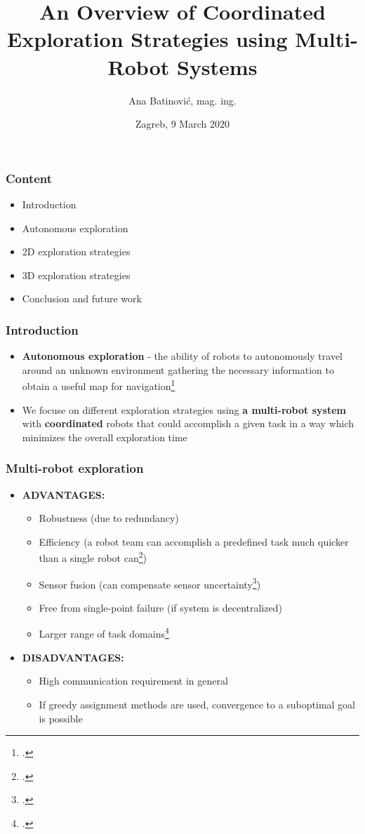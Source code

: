 \documentclass[aspectratio=43,mathserif]{beamer}
\author{Ana Batinović, mag. ing.}
\title[PhD Qualifying Exam]{An Overview of Coordinated Exploration Strategies using Multi-Robot Systems}
\date{Zagreb, 9 March 2020}
\begin{document}
\begin{frame}
\titlepage
\end{frame}
\begin{frame}
	\frametitle{Content}
	\begin{itemize}
		\item[1)] Introduction
		\item[2)] Autonomous exploration
		\item[3)] 2D exploration strategies
		\item[4)] 3D exploration strategies
		\item[5)] Conclusion and future work
	\end{itemize}
\end{frame}

\begin{frame}
	\frametitle{Introduction}
	\begin{itemize}
		\item[-] \textbf{Autonomous exploration} - the ability of robots to autonomously travel around an unknown environment gathering the necessary information to obtain a useful map for navigation\footcite{Julia2012}
		\item[-] We focuse on different exploration strategies using \textbf{a multi-robot system} with \textbf{coordinated} robots that could accomplish a given task in a way which minimizes the overall exploration time
	\end{itemize}
\end{frame}

\begin{frame}
\frametitle{Multi-robot exploration}
\begin{itemize}
	\item[-] \textbf{ADVANTAGES:}
		\begin{itemize}
			\item[-] Robustness (due to redundancy)
			\item[-] Efficiency (a robot team can accomplish a predefined task much quicker than a single robot can\footcite{Dias2000})
			\item[-] Sensor fusion (can compensate sensor uncertainty\footcite{Wurm2008})
			\item[-] Free from single-point failure (if system is decentralized)
			\item[-] Larger range of task domains\footcite{Dias2006}
		\end{itemize}
	\item[-] \textbf{DISADVANTAGES:}
		\begin{itemize}
		\item[-] High communication requirement in general
		\item[-] If greedy assignment methods are used, convergence to a suboptimal goal is possible
	\end{itemize} 
\end{itemize}
\end{frame}
\end{document}
